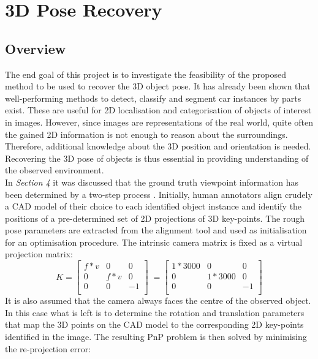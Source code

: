 \documentclass[main.tex]{subfiles}
\begin{document}
\section{3D Pose Recovery}
\subsection{Overview}
The end goal of this project is to investigate the feasibility of the proposed method to be used to recover the 3D object pose. It has already been shown that well-performing methods to detect, classify and segment car instances by parts exist. These are useful for 2D localisation and categorisation of objects of interest in images. However, since images are representations of the real world, quite often the gained 2D information is not enough to reason about the surroundings. Therefore, additional knowledge about the 3D position and orientation is needed. Recovering the 3D pose of objects is thus essential in providing understanding of the observed environment. \\
\indent In \emph{Section 4} it was discussed that the ground truth viewpoint information has been determined by a two-step process \cite{Xiang2014}. Initially, human annotators align crudely a CAD model of their choice to each identified object instance and identify the positions of a pre-determined set of 2D projections of 3D key-points. The rough pose parameters are extracted from the alignment tool and used as initialisation for an optimisation procedure. The intrinsic camera matrix is fixed as a virtual projection matrix:
\begin{equation} 
K = 
\begin{bmatrix}
f*v & 0 & 0 \\
0 & f*v & 0 \\
0 & 0 & -1 \\
\end{bmatrix} \;
=
\begin{bmatrix}
1*3000 & 0 & 0 \\
0 & 1*3000 & 0 \\
0 & 0 & -1 \\
\end{bmatrix}
\end{equation}
\indent It is also assumed that the camera always faces the centre of the observed object. In this case what is left is to determine the rotation and translation parameters that map the 3D points on the CAD model to the corresponding 2D key-points identified in the image. The resulting PnP problem is then solved by minimising the re-projection error:
\end{document}

